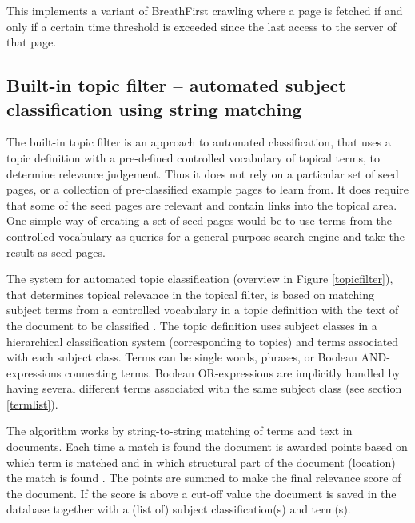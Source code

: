 This implements a variant of BreathFirst crawling where a page is fetched if and only if 
a certain time threshold is exceeded 
since the last access to the server of that page.

\subsection{Built-in topic filter -- automated subject classification using string matching}
\label{autoclass}
The built-in topic filter is an approach to automated classification,
that uses a topic definition with a pre-defined controlled vocabulary of
topical terms, to determine relevance judgement. Thus it does not rely
on a particular set of seed pages, or a collection of pre-classified
example pages to learn from. It does require that some of the seed pages
are relevant and contain links into the topical area.
One simple way of creating a set of seed pages would be to use terms
from the controlled vocabulary as queries for a general-purpose search
engine and take the result as seed pages.

The system for automated topic classification (overview in Figure \ref{topicfilter}), that determines
topical relevance in the topical filter, is based on matching subject
terms from a controlled vocabulary in a topic
definition with the text of the document to be classified
\cite{ardo99:_online99}. The topic definition uses
subject classes in a hierarchical classification system (corresponding
to topics) and terms
associated with each subject class. Terms can be single words, phrases,
 or Boolean AND-expressions connecting terms.
Boolean OR-expressions are implicitly handled by having several
different terms associated with the same subject class (see section \ref{termlist}).

The algorithm works by string-to-string matching of terms and
text in documents.
Each time a match is found the document is awarded points based on
which term is matched and in which structural part of the document
(location) the match is found \cite{ardo05:_ECDL}.  The points are summed to make the final
relevance score of the document. If the score is above a cut-off value the
document is saved in the database together with a (list of) subject
classification(s) and term(s).

